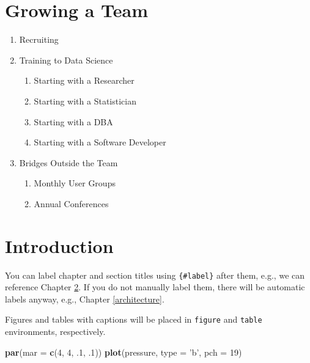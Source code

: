 \documentclass[]{book}
\newenvironment{Shaded}{\begin{snugshade}}{\end{snugshade}}
\newcommand{\DataTypeTok}[1]{\textcolor[rgb]{0.13,0.29,0.53}{#1}}
\newcommand{\DecValTok}[1]{\textcolor[rgb]{0.00,0.00,0.81}{#1}}
\newcommand{\FloatTok}[1]{\textcolor[rgb]{0.00,0.00,0.81}{#1}}
\newcommand{\KeywordTok}[1]{\textcolor[rgb]{0.13,0.29,0.53}{\textbf{#1}}}
\newcommand{\NormalTok}[1]{#1}
\newcommand{\StringTok}[1]{\textcolor[rgb]{0.31,0.60,0.02}{#1}}
\providecommand{\tightlist}{%
  \setlength{\itemsep}{0pt}\setlength{\parskip}{0pt}}
\theoremstyle{definition}
\theoremstyle{definition}
\theoremstyle{definition}
\theoremstyle{remark}
\begin{document}
\hypertarget{growing-a-team}{%
\chapter{Growing a Team}\label{growing-a-team}}

\begin{enumerate}
\def\labelenumi{\arabic{enumi}.}
\tightlist
\item
  Recruiting
\item
  Training to Data Science

  \begin{enumerate}
  \def\labelenumii{\arabic{enumii}.}
  \tightlist
  \item
    Starting with a Researcher
  \item
    Starting with a Statistician
  \item
    Starting with a DBA
  \item
    Starting with a Software Developer
  \end{enumerate}
\item
  Bridges Outside the Team

  \begin{enumerate}
  \def\labelenumii{\arabic{enumii}.}
  \tightlist
  \item
    Monthly User Groups
  \item
    Annual Conferences
  \end{enumerate}
\end{enumerate}

\hypertarget{intro}{%
\chapter{Introduction}\label{intro}}

You can label chapter and section titles using \texttt{\{\#label\}}
after them, e.g., we can reference Chapter \ref{intro}. If you do not
manually label them, there will be automatic labels anyway, e.g.,
Chapter \ref{architecture}.

Figures and tables with captions will be placed in \texttt{figure} and
\texttt{table} environments, respectively.

\begin{Shaded}
\begin{Highlighting}[]
\KeywordTok{par}\NormalTok{(}\DataTypeTok{mar =} \KeywordTok{c}\NormalTok{(}\DecValTok{4}\NormalTok{, }\DecValTok{4}\NormalTok{, }\FloatTok{.1}\NormalTok{, }\FloatTok{.1}\NormalTok{))}
\KeywordTok{plot}\NormalTok{(pressure, }\DataTypeTok{type =} \StringTok{'b'}\NormalTok{, }\DataTypeTok{pch =} \DecValTok{19}\NormalTok{)}
\end{Highlighting}
\end{Shaded}
\end{document}
